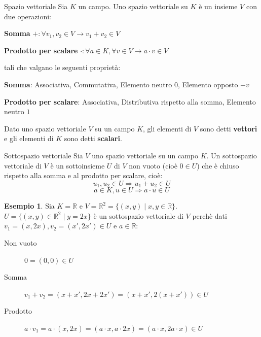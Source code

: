 \documentclass[a4paper]{article}
\theoremstyle{definition}
\newtheorem*{es}{Esempio}
\begin{document}
\begin{deff}{Spazio vettoriale}{}
	Sia $K$ un campo. Uno spazio vettoriale su $K$ è un insieme $V$ con due operazioni:
	\begin{description}
		\item \textbf{Somma} $+: \forall v_1, v_2 \in V \rightarrow v_1 + v_2 \in V$
		\item \textbf{Prodotto per scalare} $\cdot: \forall a \in K, \forall v \in V \rightarrow a \cdot v \in V$
	\end{description}
	tali che valgano le seguenti proprietà:
	\begin{description}
		\item \textbf{Somma}: Associativa, Commutativa, Elemento neutro $0$, Elemento opposto $-v$
		\item \textbf{Prodotto per scalare}: Associativa, Distributiva rispetto alla somma, Elemento neutro $1$
	\end{description}
\end{deff}
Dato uno spazio vettoriale $V$ su un campo $K$, gli elementi di $V$ sono detti \textbf{vettori} e gli elementi di $K$ sono detti \textbf{scalari}.

\begin{deff}{Sottospazio vettoriale}{}
	Sia $V$ uno spazio vettoriale su un campo $K$. Un sottospazio vettoriale di $V$ è un sottoinsieme $U$ di $V$ non vuoto (cioè $0 \in U$) che è chiuso rispetto alla somma e al prodotto per scalare, cioè:
	\[ u_1, u_2 \in U \Rightarrow u_1 + u_2 \in U \]
	\[ a \in K, u \in U \Rightarrow a \cdot u \in U \]
\end{deff}

\begin{es}
	Sia $K = \mathbb{R}$ e $V = \mathbb{R}^2 = \{(x, y) \mid x, y \in \mathbb{R}\}$. \\
	$U = \{(x, y) \in \mathbb{R}^2 \mid y = 2x\}$ è un sottospazio vettoriale di $V$ perchè dati $v_1 = (x, 2x), v_2 = (x', 2x') \in U$ e $a \in \mathbb{R}$:
	\begin{description}
		\item[Non vuoto] $0 = (0, 0) \in U$
		\item[Somma] $v_1 + v_2 = (x + x', 2x + 2x') = (x + x', 2(x + x')) \in U$
		\item[Prodotto] $a \cdot v_1 = a \cdot (x, 2x) = (a \cdot x, a \cdot 2x) = (a \cdot x, 2a \cdot x) \in U$
	\end{description}
\end{es}
\end{document}
